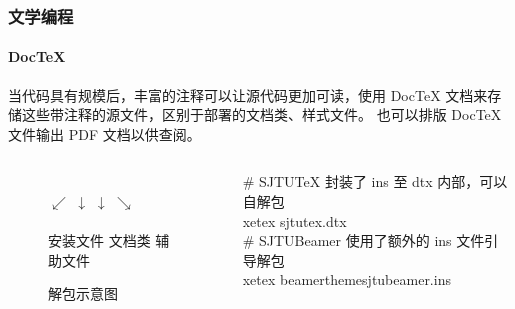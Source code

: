 \begin{frame}[fragile]
  \frametitle{文学编程}
  \framesubtitle{Doc\TeX{}}


  当代码具有规模后，丰富的注释可以让源代码更加可读，使用 Doc\TeX{} 文档来存储这些带注释的源文件，区别于部署的文档类、样式文件。
  也可以排版 Doc\TeX{} 文件输出 PDF 文档以供查阅。

  \begin{columns}
    \begin{column}{.4\textwidth}
      \begin{figure}
        \centering
        \\
        $\swarrow$ \quad $\downarrow$ \quad $\downarrow$ \quad $\searrow$\\
            \\[0.5ex]
        {\small 安装文件 文档类 \quad 辅助文件 \hspace*{2em}}
        \caption{\SJTUTeX{} 解包示意图}
      \end{figure}
    \end{column}
    \begin{column}{.5\textwidth}
      \begin{exampleblock}{\faTerminal}
        \ttfamily
        {\color{gray} \# SJTUTeX 封装了 ins 至 dtx 内部，可以自解包} \\
        xetex sjtutex.dtx \\
        {\color{gray} \# SJTUBeamer 使用了额外的 ins 文件引导解包}\\
        xetex beamerthemesjtubeamer.ins \\
      \end{exampleblock}
      
    \end{column}
  \end{columns}


\end{frame}

